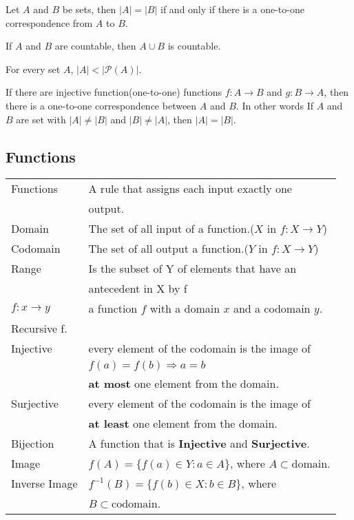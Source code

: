 \documentclass[5pt]{article}
\begin{document}
\begin{multicols}{2}
\begin{theorem}
    Let $A$ and $B$ be sets, then $|A|=|B|$ if and only if there is a one-to-one correspondence from $A$ to $B$.
\end{theorem}

\begin{theorem}
    If $A$ and $B$ are countable, then $A\cup B$ is countable. 
\end{theorem}

\begin{theorem}
    For every set $A$, $|A|<|\mathcal{P}(A)|$.
\end{theorem}

\begin{theorem}
     If there are injective function(one-to-one) functions $f\!:A\to B$ and $g\!:B\to A$, then there is a one-to-one correspondence between $A$ and $B$. 
     In other words If $A$ and $B$ are set with $|A|\neq|B|$ and $|B|\neq|A|$, then $|A|=|B|$.
\end{theorem}

\subsection{Functions}

\begin{tabular}{ll}
    Functions           & A rule that assigns each input exactly one \\
                        & output.\\
    Domain              & The set of all input of a function.($X$ in $f:X\rightarrow Y$)\\
    Codomain            & The set of all output a function.($Y$ in $f:X\rightarrow Y$)\\
    Range               & Is the subset of Y of elements that have an\\
                        & antecedent in X by f\\
    $f:x\rightarrow y$  & a function $f$ with a domain $x$ and a codomain $y$.\\
    Recursive f.        & \\
    Injective           & every element of the codomain is the image  of \\
                        & $f(a)=f(b)\Rightarrow a=b$\\
                        & \textbf{at most} one element from the domain.\\
    Surjective          & every element of the codomain is the image  of \\
                        & \textbf{at least} one element from the domain.\\
    Bijection           & A function that is \textbf{Injective} and \textbf{Surjective}.\\
    Image               & $f(A)=\{f(a)\in Y: a\in A\}$, where $A\subset\text{domain}$.\\
    Inverse Image       & $f^{-1}(B)=\{f(b)\in X: b\in B\}$, where \\
                        & $B\subset\text{codomain}$.\\
\end{tabular}


\end{multicols}
\end{document}

